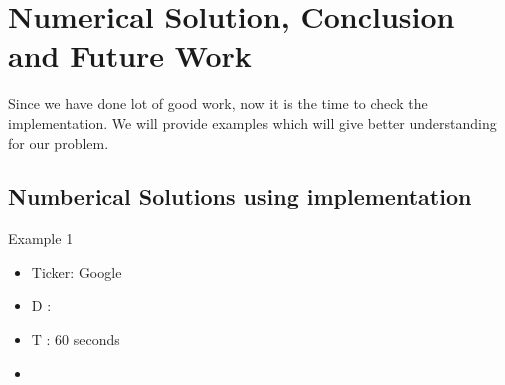 \chapter{Numerical Solution, Conclusion and Future Work}
Since we have done lot of good work, now it is the time to check the implementation.
We will provide examples which will give better understanding for our problem.
\section{Numberical Solutions using implementation}
Example 1
\begin{itemize}
  \item Ticker: Google
  \item  D : 
  \item  T : 60 seconds
  \item 
\end{itemize}